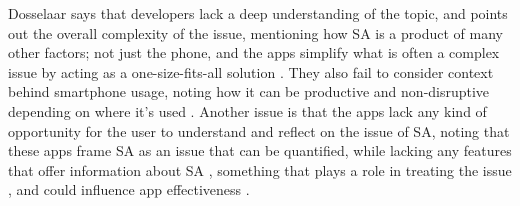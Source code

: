 \documentclass[12pt]{article}
\begin{document}
Dosselaar says that developers lack a deep understanding of the topic, and points out the overall complexity of the issue, 
mentioning how SA is a product of many other factors; not just the phone, and the apps simplify what is often a complex 
issue by acting as a one-size-fits-all solution \autocite{RefWorks:RefID:35-dosselaar2017smartphone, RefWorks:RefID:132-monge2019race}. 
They also fail to consider context behind smartphone usage, noting how it can be productive 
\autocite{RefWorks:RefID:35-dosselaar2017smartphone} and non-disruptive depending on where it's used 
\autocite{RefWorks:RefID:126-petrucco2021user}. Another issue is that the apps lack any kind of opportunity
for the user to understand and reflect on the issue of SA, noting that these apps frame
SA as an issue that can be quantified, while lacking any features that offer information about SA 
\autocite{RefWorks:RefID:35-dosselaar2017smartphone}, something that plays a role in treating the issue 
\autocite{RefWorks:RefID:118-rosa2022problematic}, and could influence app effectiveness 
\autocite{RefWorks:RefID:125-rahmillah2023evaluating}.\newline




\end{document}
